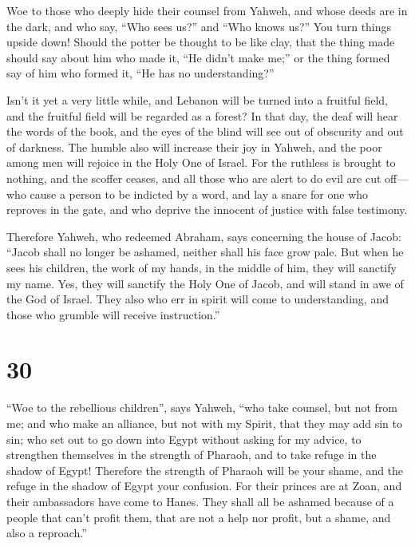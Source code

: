  Woe to those who deeply hide their counsel from Yahweh,
and whose deeds are in the dark, and who say, ``Who sees us?'' and ``Who
knows us?''  You turn things upside down! Should the potter
be thought to be like clay, that the thing made should say about him who
made it, ``He didn't make me;'' or the thing formed say of him who
formed it, ``He has no understanding?''

 Isn't it yet a very little while, and Lebanon will be
turned into a fruitful field, and the fruitful field will be regarded as
a forest?  In that day, the deaf will hear the words of the
book, and the eyes of the blind will see out of obscurity and out of
darkness.  The humble also will increase their joy in
Yahweh, and the poor among men will rejoice in the Holy One of Israel.
 For the ruthless is brought to nothing, and the scoffer
ceases, and all those who are alert to do evil are cut off---
 who cause a person to be indicted by a word, and lay a
snare for one who reproves in the gate, and who deprive the innocent of
justice with false testimony.

 Therefore Yahweh, who redeemed Abraham, says concerning
the house of Jacob: ``Jacob shall no longer be ashamed, neither shall
his face grow pale.  But when he sees his children, the
work of my hands, in the middle of him, they will sanctify my name. Yes,
they will sanctify the Holy One of Jacob, and will stand in awe of the
God of Israel.  They also who err in spirit will come to
understanding, and those who grumble will receive instruction.''

\hypertarget{section-29}{%
\section{30}\label{section-29}}

 ``Woe to the rebellious children'', says Yahweh, ``who take
counsel, but not from me; and who make an alliance, but not with my
Spirit, that they may add sin to sin;  who set out to go
down into Egypt without asking for my advice, to strengthen themselves
in the strength of Pharaoh, and to take refuge in the shadow of Egypt!
 Therefore the strength of Pharaoh will be your shame, and
the refuge in the shadow of Egypt your confusion.  For their
princes are at Zoan, and their ambassadors have come to Hanes.
 They shall all be ashamed because of a people that can't
profit them, that are not a help nor profit, but a shame, and also a
reproach.''

